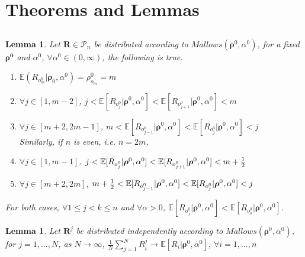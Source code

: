 \documentclass[11pt, oneside]{article}   	%
\newtheorem{lemma}[theorem]{Lemma}
\begin{document}
\section{Theorems and Lemmas}
\subsection{ }
\begin{lemma} \label{lem:nocross}
Let $\bm{R}\in \mathcal{P}_n$ be distributed according to $Mallows(\bm{\rho}^0, \alpha^0)$, for a fixed $\bm{\rho^0}$ and $\alpha^0$, $\forall \alpha^0 \in (0, \infty)$, the following is true.

	\begin{enumerate} 
		 If $n$ is odd, i.e., $n = 2m - 1$,
		\item{$\mathbb{E}(R_{o^0_m}|\bm{\rho}_{0}, \alpha^0) = \rho^0_{o_m} = m$ }
		\item{$\forall j \in [1, m-2]$, $j< \mathbb{E}[R_{o^0_j}|\bm{\rho}^0, \alpha^0] <\mathbb{E}[R_{o^0_{j+1}}|\bm{\rho}^0, \alpha^0] < m$}
		\item{$\forall j \in [m+2, 2m-1]$, $m< \mathbb{E}[R_{o^0_{j-1}}|\bm{\rho}^0, \alpha^0] <\mathbb{E}[R_{o^0_{j}}|\bm{\rho}^0, \alpha^0] < j$}\\		
Similarly, if $n$ is even, i.e. $n = 2m$, 

	\item{$\forall j \in [1, m-1]$, $j< \mathbb{E}[R_{o^0_j}|\bm{\rho}^0, \alpha^0] <\mathbb{E}[R_{o^0_{j+1}}|\bm{\rho}^0, \alpha^0] < m+ {1\over 2}$}
	\item{$\forall j \in [m+2, 2m]$, $m+ {1\over 2}<\mathbb{E}[R_{o^0_{j-1}}|\bm{\rho}^0, \alpha^0] <\mathbb{E}[R_{o^0_{j}}|\bm{\rho}^0, \alpha^0] < j$}
\end{enumerate}
For both cases, $\forall 1\leq j<k\leq n$ and $\forall \alpha > 0 $,
{$\mathbb{E}[R_{o^0_j}|\bm{\rho}^0, \alpha^0]<\mathbb{E}[R_{o^0_k}|\bm{\rho}^0, \alpha^0]$}.
\end{lemma}

\begin{lemma}\label{lem:largenumbers}
 Let $\bm{R}^j$ be distributed independently according to $Mallows (\bm{\rho}^0, \alpha^0)$, for $j = 1, ...,N$, as $N \rightarrow \infty$, $\frac{1}{N}\sum\limits_{j=1}^{N}R^j_i \rightarrow \mathbb{E}[R_i|\bm{\rho}^0, \alpha ^0]$, $\forall i = 1, ..., n$
\end{lemma}
\end{document}

